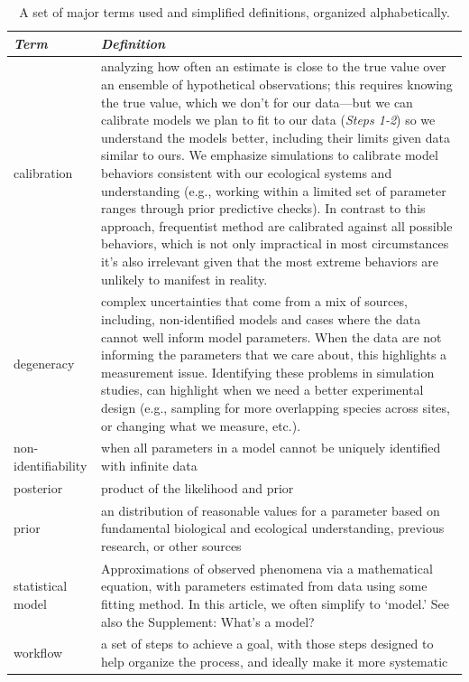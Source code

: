 \documentclass[11pt]{article}
\begin{document}
\begin{table}
\caption{A set of major terms used and simplified definitions, organized alphabetically.}
\begin{tabular}{ p{3 cm}  p{12 cm} }  \hline \hline
 \emph{Term}   & \emph{Definition}\\ 
\hline \hline
calibration & analyzing how often an estimate is close to the true value over an ensemble of hypothetical observations; this requires knowing the true value, which we don't for our data---but we can calibrate models we plan to fit to our data (\emph{Steps 1-2}) so we understand the models better, including their limits given data similar to ours. We emphasize simulations to calibrate model behaviors consistent with our ecological systems and understanding (e.g., working within a limited set of parameter ranges through prior predictive checks). In contrast to this approach, frequentist method are calibrated against all possible behaviors, which is not only impractical in most circumstances it’s also irrelevant given that the most extreme behaviors are unlikely to manifest in reality. \\\hline
degeneracy & complex uncertainties that come from a mix of sources, including, non-identified models and cases where the data cannot well inform model parameters. When the data are not informing the parameters that we care about, this highlights a measurement issue. Identifying these problems in simulation studies, can highlight when we need a better experimental design (e.g., sampling for more overlapping species across sites, or changing what we measure, etc.).  \\\hline
non-identifiability & when all parameters in a model cannot be uniquely identified with infinite data \\\hline
posterior & product of the likelihood and prior \\\hline
prior & an distribution of reasonable values for a parameter based on fundamental biological and ecological understanding, previous research, or other sources \\\hline
statistical model & Approximations of observed phenomena via a mathematical equation, with parameters estimated from data using some fitting method. In this article, we often simplify to `model.' See also the Supplement: What's a model? \\\hline
workflow & a set of steps to achieve a goal, with those steps designed to help organize the process, and ideally make it more systematic  \\\hline
\hline
\end{tabular}
\label{tab:glossary}
\end{table}
\end{document}
